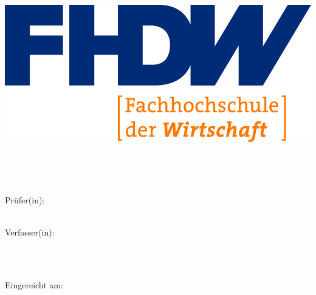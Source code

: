 
\begin{titlepage}

\begin{center}
\includegraphics[scale=0.8]{img/fhdw}

\vspace{7mm}

\Huge{\bfseries\dokumententyp}\\

\vspace{5mm}

\LARGE{\dokumententitel}\\

\vspace{15mm}

\large{Prüfer(in):\\

\dokumentenpruefer\\

\vspace{15mm}

Verfasser(in):\\

\dokumentenautor\\

\vspace{3mm}

\vspace{7mm}

\studiengang\\

}

\enlargethispage{2em}

\vspace{15mm}

\large{Eingereicht am:\\

\abgabedatum \\

}

\end{center}


\end{titlepage}

